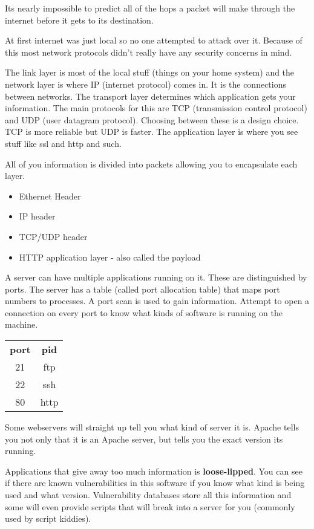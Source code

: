 \documentclass{article}
\begin{document}


Its nearly impossible to predict all of the hops a packet will make through the internet before it gets to its destination.


At first internet was just local so no one attempted to attack over it. Because of this most network protocols didn't really have any security concerns in mind.

The link layer is most of the local stuff (things on your home system) and the network layer is where IP (internet protocol) comes in. It is the connections between networks. The transport layer determines which application gets your information. The main protocols for this are TCP (transmission control protocol) and UDP (user datagram protocol). Choosing between these is a design choice. TCP is more reliable but UDP is faster. The application layer is where you see stuff like ssl and http and such.

All of you information is divided into packets allowing you to encapsulate each layer. 
\begin{itemize}
	\item Ethernet Header
	\item IP header
	\item TCP/UDP header
	\item HTTP application layer - also called the payload
\end{itemize}


A server can have multiple applications running on it. These are distinguished by ports. The server has a table (called port allocation table) that maps port numbers to processes. A port scan is used to gain information. Attempt to open a connection on every port to know what kinds of software is running on the machine.

\begin{tabular}{|c|c|}
\textbf{port} & \textbf{pid}\\
21 & ftp\\
22 & ssh\\
80 & http\\
\end{tabular}

Some webservers will straight up tell you what kind of server it is. Apache tells you not only that it is an Apache server, but tells you the exact version its running.


Applications that give away too much information is \textbf{loose-lipped}. You can see if there are known vulnerabilities in this software if you know what kind is being used and what version. Vulnerability databases store all this information and some will even provide scripts that will break into a server for you (commonly used by script kiddies).
\end{document}
